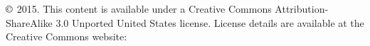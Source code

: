 \chapter*{}
\vfill


\noindent $\copyright$ 2015. This content is available under a Creative Commons Attribution-ShareAlike 3.0 Unported United States license. License details are available at the Creative Commons website:  \\


